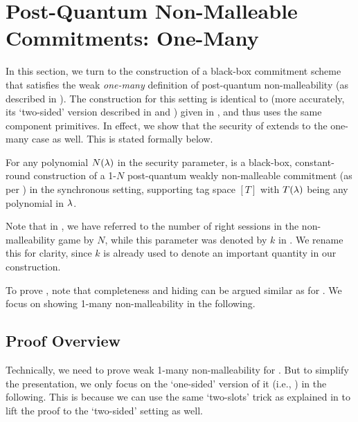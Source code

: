 
\section{Post-Quantum Non-Malleable Commitments: One-Many}
\label{sec:BB-NMCom:one-many}




In this section, we turn to the construction of a black-box commitment scheme that satisfies the weak {\em one-many} definition of post-quantum non-malleability (as described in ). The construction for this setting is identical to  (more accurately, its `two-sided' version described in  and ) given in , and thus uses the same component primitives. In effect, we show that the security of  extends to the one-many case as well. This is stated formally below. 
\begin{theorem}\label{thm:pqmnc:1-many}
For any polynomial $N(\lambda)$ in the security parameter,  is a black-box, constant-round construction of a 1-$N$ post-quantum weakly non-malleable commitment (as per ) in the synchronous setting, supporting tag space $[T]$ with $T(\lambda)$ being any polynomial in $\lambda$.
\end{theorem}

Note that in , we have referred to the number of right sessions in the non-malleability game by $N$, while this parameter was denoted by $k$ in . We rename this for clarity, since $k$ is already used to denote an important quantity in our construction.

To prove , note that completeness and hiding can be argued similar as for . We focus on showing 1-many non-malleability in the following. 





\subsection{Proof Overview}

Technically, we need to prove weak 1-many non-malleability for . But to simplify the presentation, we only  focus on the `one-sided' version of it (i.e., ) in the following. This is because we can use the same `two-slots' trick as explained in  to lift the proof to the `two-sided' setting as well.

